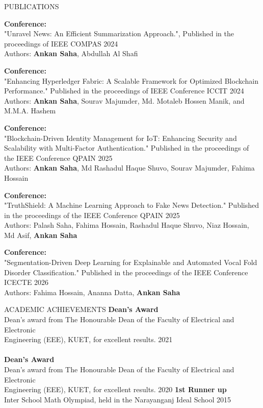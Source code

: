 \documentclass{resume} %
\begin{document}
\begin{rSection}{PUBLICATIONS}
\vspace{-1.25em}

\item {\bf Conference:}\\
{"Unravel News: An Efficient Summarization Approach.", Published in the proceedings of IEEE COMPAS 2024} \\
{Authors: {\bf Ankan Saha}, Abdullah Al Shafi}

\item {\bf Conference:}\\
{"Enhancing Hyperledger Fabric: A Scalable Framework for Optimized Blockchain Performance." Published in the proceedings of IEEE Conference ICCIT 2024} \\
{Authors: {\bf Ankan Saha}, Sourav Majumder, Md. Motaleb Hossen Manik, and M.M.A. Hashem}

\item {\bf Conference:}\\
{"Blockchain-Driven Identity Management for IoT: Enhancing Security and Scalability with Multi-Factor Authentication." Published in the proceedings of the IEEE Conference QPAIN 2025} \\
{Authors: {\bf Ankan Saha}, Md Rashadul Haque Shuvo, Sourav Majumder, Fahima Hossain}

\item {\bf Conference:}\\
{"TruthShield: A Machine Learning Approach to Fake News Detection." Published in the proceedings of the IEEE Conference QPAIN 2025} \\
{Authors: Palash Saha, Fahima Hossain, Rashadul Haque Shuvo, Niaz Hossain, Md Asif, {\bf Ankan Saha}}

\item {\bf Conference:}\\
{"Segmentation-Driven Deep Learning for Explainable and Automated Vocal Fold Disorder Classification." Published in the proceedings of the IEEE Conference ICECTE 2026} \\
{Authors: Fahima Hossain, Ananna Datta, {\bf Ankan Saha}}




\end{rSection}


\begin{rSection}{ACADEMIC ACHIEVEMENTS}
{\bf Dean's Award}\\
Dean's award from The Honourable Dean of the Faculty of Electrical and Electronic\\ Engineering (EEE), KUET, for excellent results. \hfill{2021}\\ \\
{\bf Dean's Award}\\
Dean's award from The Honourable Dean of the Faculty of Electrical and Electronic\\ Engineering (EEE), KUET, for excellent results. \hfill{2020}
{\bf 1st Runner up}\\
Inter School Math Olympiad, held in the Narayanganj Ideal School \hfill{2015}

\end{rSection}
\end{document}
